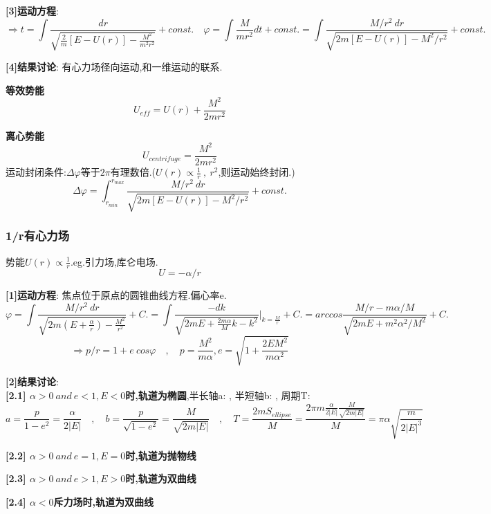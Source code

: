 \documentclass{article}
\begin{document}
        \textbf{[3]运动方程}:
            $$\Rightarrow t = \int \frac{d r}{\sqrt{\frac{2}{m}[E-U(r)] - \frac{M^2}{m^2 r^2}}} + const. \quad \varphi = \int \frac{M}{m r^2} d t  + const.= \int \frac{M/r^2\ dr}{\sqrt{2m [E-U(r)] - M^2/r^2}} + const.$$
    
        \textbf{[4]结果讨论}: 有心力场径向运动,和一维运动的联系.
    
        \textbf{等效势能}
            $$U_{eff} = U(r) + \frac{M^2}{2mr^2}$$
    
        \textbf{离心势能}
            $$U_{centrifuge} = \frac{M^2}{2mr^2}$$
            运动封闭条件:$\Delta \varphi$等于$2\pi$有理数倍.\quad($U(r) \propto \frac{1}{r}\ ,\ r^2$,则运动始终封闭.)
            $$\Delta \varphi = \int_{r_{min}} ^{r_{max}} \frac{M/r^2\ dr}{\sqrt{2m [E-U(r)] - M^2/r^2}} + const.$$
    

        \subsubsection{1/r有心力场}
        势能$U(r) \propto \frac{1}{r}$.\quad eg.引力场,库仑电场.
            $$U = - \alpha / r$$
            
        \textbf{[1]运动方程}: 焦点位于原点的圆锥曲线方程.\quad 偏心率e.
            $$\varphi = \int \frac{M/r^2\ dr}{\sqrt{2m (E+\frac{\alpha}{r}) - \frac{M^2}{r^2}}} + C. = \int \frac{-dk}{\sqrt{2mE + \frac{2m\alpha}{M}k - k^2}}|_{k = \frac{M}{r}} + C. = arccos\frac{M/r - m\alpha /M}{\sqrt{2mE + m^2 \alpha ^2 /M^2}} + C.$$
            $$\Rightarrow p/r = 1 + e \ cos \varphi \quad , \quad p = \frac{M^2}{m\alpha} , e = \sqrt{1 + \frac{2 E M^2}{m \alpha^2}}$$
            
        \textbf{[2]结果讨论}: \\
        
        \textbf{[2.1] $\alpha > 0\ and\ e<1, E<0$时,轨道为椭圆}\quad,半长轴a: \quad , 半短轴b: \quad , 周期T:
        $$a = \frac{p}{1-e^2} = \frac{\alpha}{2|E|} \quad , \quad b = \frac{p}{\sqrt{1-e^2}} = \frac{M}{\sqrt{2m|E|}} \quad , \quad T = \frac{2mS_{ellipse}}{M} = \frac{2\pi m \frac{\alpha}{2|E|} \frac{M}{\sqrt{2m|E|}}}{M} = \pi \alpha \sqrt{\frac{m}{2|E|^3}} $$
        
        \textbf{[2.2] $\alpha > 0\ and\ e=1, E=0$时,轨道为抛物线}
        
        \textbf{[2.3] $\alpha > 0\ and\ e>1, E>0$时,轨道为双曲线}
        
        \textbf{[2.4] $\alpha < 0$斥力场时,轨道为双曲线}
\end{document}
